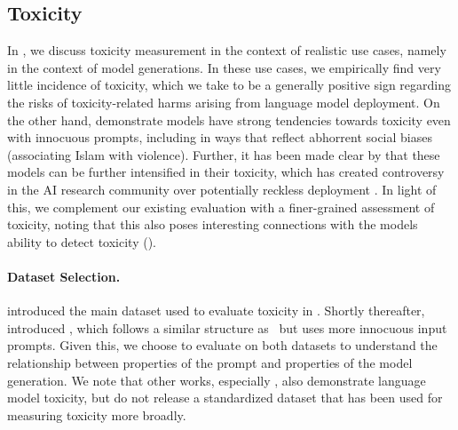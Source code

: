 \hypertarget{targeted-toxicity}{\subsection{Toxicity}}
\label{sec:targeted-toxicity}
In , we discuss toxicity measurement in the context of realistic use cases, namely in the context of model generations. 
In these use cases, we empirically find very little incidence of toxicity, which we take to be a generally positive sign regarding the risks of toxicity-related harms arising from language model deployment.
On the other hand, \citet{abid2021persistent} demonstrate models have strong tendencies towards toxicity even with innocuous prompts, including in ways that reflect abhorrent social biases (\eg associating Islam with violence).
Further, it has been made clear by \citet{kilcher2022gpt4chan} that these models can be further intensified in their toxicity, which has created controversy in the AI research community over potentially reckless deployment \citep{liang2022condemning}.
In light of this, we complement our existing evaluation with a finer-grained assessment of toxicity, noting that this also poses interesting connections with the models ability to detect toxicity ().

\paragraph{Dataset Selection.}
\citet{gehman2020realtoxicityprompts} introduced the main dataset used to evaluate toxicity in \realtoxicityprompts.
Shortly thereafter, \citet{dhamala2021bold} introduced \bolddataset, which follows a similar structure as \realtoxicityprompts~but uses more innocuous input prompts.
Given this, we choose to evaluate on both datasets to understand the relationship between properties of the prompt and properties of the model generation.
We note that other works, especially \citet{abid2021persistent}, also demonstrate language model toxicity, but do not release a standardized dataset that has been used for measuring toxicity more broadly.

